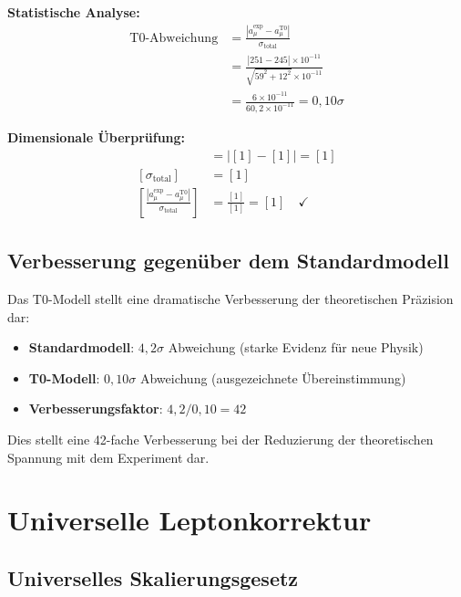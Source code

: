 \documentclass[12pt,a4paper]{report}
\begin{document}
	\textbf{Statistische Analyse:}
	\begin{align}
		\text{T0-Abweichung} &= \frac{|a_\mu^{\text{exp}} - a_\mu^{\text{T0}}|}{\sigma_{\text{total}}} \\
		&= \frac{|251 - 245| \times 10^{-11}}{\sqrt{59^2 + 12^2} \times 10^{-11}} \\
		&= \frac{6 \times 10^{-11}}{60,2 \times 10^{-11}} = 0,10\sigma
	\end{align}
	
	\textbf{Dimensionale Überprüfung:}
	\begin{align}
		[|a_\mu^{\text{exp}} - a_\mu^{\text{T0}}|] &= |[1] - [1]| = [1] \\
		[\sigma_{\text{total}}] &= [1] \\
		\left[\frac{|a_\mu^{\text{exp}} - a_\mu^{\text{T0}}|}{\sigma_{\text{total}}}\right] &= \frac{[1]}{[1]} = [1] \quad \checkmark
	\end{align}
	
	\subsection{Verbesserung gegenüber dem Standardmodell}
	\label{subsec:improvement_over_sm}
	
	Das T0-Modell stellt eine dramatische Verbesserung der theoretischen Präzision dar:
	\begin{itemize}
		\item \textbf{Standardmodell}: $4,2\sigma$ Abweichung (starke Evidenz für neue Physik)
		\item \textbf{T0-Modell}: $0,10\sigma$ Abweichung (ausgezeichnete Übereinstimmung)
		\item \textbf{Verbesserungsfaktor}: $4,2/0,10 = 42$
	\end{itemize}
	
	Dies stellt eine 42-fache Verbesserung bei der Reduzierung der theoretischen Spannung mit dem Experiment dar.
	
	\section{Universelle Leptonkorrektur}
	\label{sec:universal_lepton_correction}
	
	\subsection{Universelles Skalierungsgesetz}
	\label{subsec:universal_scaling_law}
	
\end{document}
